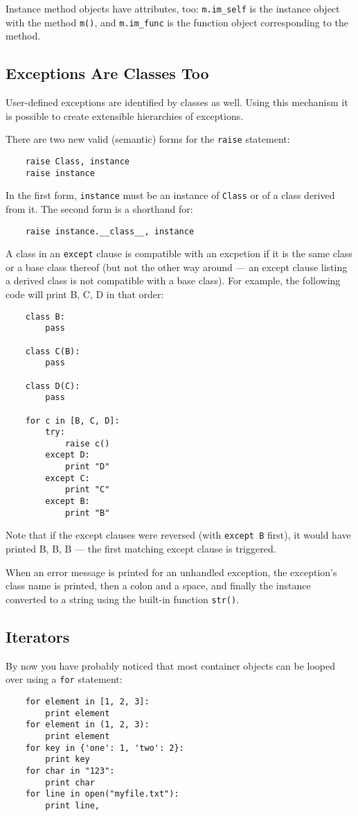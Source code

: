 \documentclass[UTF8]{article}
\begin{document}
Instance method objects have attributes, too: \texttt{m.im\_self} is the instance object with the
method \texttt{m()}, and \texttt{m.im\_func} is the function object corresponding to the method.

\subsection{Exceptions Are Classes Too}
User-defined exceptions are identified by classes as well. Using this mechanism it is possible to
create extensible hierarchies of exceptions.

There are two new valid (semantic) forms for the \texttt{raise} statement:
\begin{verbatim}
    raise Class, instance
    raise instance
\end{verbatim}

In the first form, \texttt{instance} must be an instance of \texttt{Class} or of a class derived
from it. The second form is a shorthand for:
\begin{verbatim}
    raise instance.__class__, instance
\end{verbatim}

A class in an \texttt{except} clause is compatible with an excpetion if it is the same class or a
base class thereof (but not the other way around --- an except clause listing a derived class is
not compatible with a base class). For example, the following code will print B, C, D in that
order:
\begin{verbatim}
    class B:
        pass

    class C(B):
        pass

    class D(C):
        pass

    for c in [B, C, D]:
        try:
            raise c()
        except D:
            print "D"
        except C:
            print "C"
        except B:
            print "B"
\end{verbatim}

Note that if the except clauses were reversed (with \texttt{except B} first), it would have printed
B, B, B --- the first matching except clause is triggered.

When an error message is printed for an unhandled exception, the exception's class name is printed,
then a colon and a space, and finally the instance converted to a string using the built-in
function \texttt{str()}.

\subsection{Iterators}
By now you have probably noticed that most container objects can be looped over using a \texttt{for}
statement:
\begin{verbatim}
    for element in [1, 2, 3]:
        print element
    for element in (1, 2, 3):
        print element
    for key in {'one': 1, 'two': 2}:
        print key
    for char in "123":
        print char
    for line in open("myfile.txt"):
        print line,
\end{verbatim}
\end{document}
